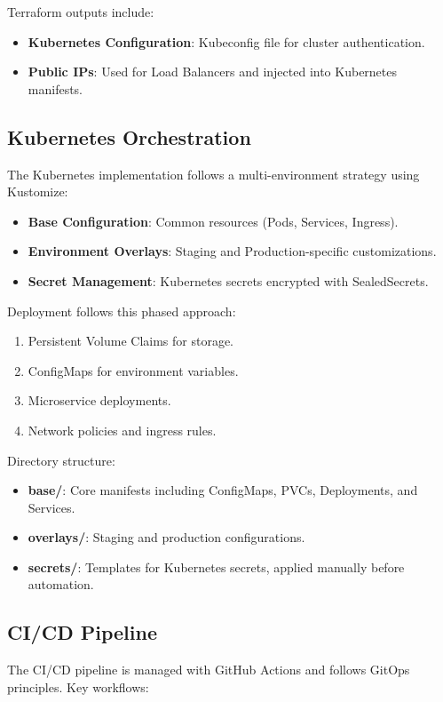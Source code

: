 Terraform outputs include:
\begin{itemize}
    \item \textbf{Kubernetes Configuration}: Kubeconfig file for cluster authentication.
    \item \textbf{Public IPs}: Used for Load Balancers and injected into Kubernetes manifests.
\end{itemize}

\subsection{Kubernetes Orchestration}
The Kubernetes implementation follows a multi-environment strategy using Kustomize:

\begin{itemize}
    \item \textbf{Base Configuration}: Common resources (Pods, Services, Ingress).
    \item \textbf{Environment Overlays}: Staging and Production-specific customizations.
    \item \textbf{Secret Management}: Kubernetes secrets encrypted with SealedSecrets.
\end{itemize}

Deployment follows this phased approach:
\begin{enumerate}
    \item Persistent Volume Claims for storage.
    \item ConfigMaps for environment variables.
    \item Microservice deployments.
    \item Network policies and ingress rules.
\end{enumerate}

Directory structure:
\begin{itemize}
    \item \textbf{base/}: Core manifests including ConfigMaps, PVCs, Deployments, and Services.
    \item \textbf{overlays/}: Staging and production configurations.
    \item \textbf{secrets/}: Templates for Kubernetes secrets, applied manually before automation.
\end{itemize}

\subsection{CI/CD Pipeline}
The CI/CD pipeline is managed with GitHub Actions and follows GitOps principles.
Key workflows:

